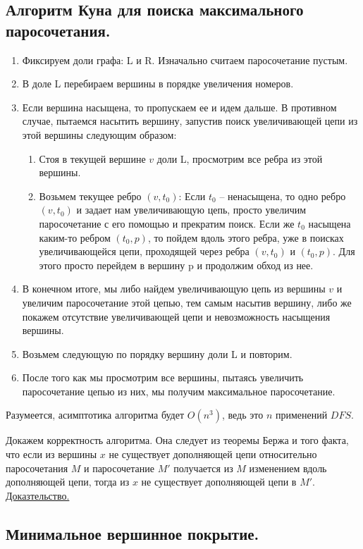 \subsection{Алгоритм Куна для поиска максимального паросочетания.}
\begin{enumerate}
	\item Фиксируем доли графа: L и R. Изначально считаем паросочетание пустым. 
	\item В доле L перебираем вершины в порядке увеличения номеров.
	\item Если вершина насыщена, то пропускаем ее и идем дальше.
В противном случае, пытаемся насытить вершину, запустив поиск увеличивающей цепи из этой вершины следующим образом: 
	\begin{enumerate}
		\item Стоя в текущей вершине $v$ доли L, просмотрим все ребра из этой вершины.
		\item Возьмем текущее ребро $(v, t_0)$: 
Если $t_0$ -- ненасыщена, то одно ребро $(v, t_0)$ и задает нам увеличивающую цепь, просто увеличим паросочетание с его помощью и прекратим поиск.
Если же $t_0$ насыщена каким-то ребром  $(t_0, p)$, то пойдем вдоль этого ребра, уже в поисках увеличивающейся цепи, проходящей через ребра $(v, t_0)$ и  $(t_0, p)$. Для этого просто перейдем в вершину p и продолжим обход из нее.
	\end{enumerate}
\item В конечном итоге, мы либо найдем увеличивающую цепь из вершины $v$ и увеличим паросочетание этой цепью, тем самым насытив вершину, либо же покажем отсутствие увеличивающей цепи и невозможность насыщения вершины.
\item Возьмем следующую по порядку вершину доли L и повторим.
\item После того как мы просмотрим все вершины, пытаясь увеличить паросочетание цепью из них, мы получим максимальное паросочетание.
\end{enumerate}
Разумеется, асимптотика алгоритма будет $O(n^3)$, ведь это $n$ применений $DFS$. 
\par
Докажем корректность алгоритма. Она следует из теоремы Бержа и того факта, что если из вершины $x$ не существует дополняющей цепи относительно паросочетания $M$ и паросочетание $M'$ получается из $M$ изменением вдоль дополняющей цепи, тогда из $x$ не существует дополняющей цепи в $M'$. \href{http://gg.gg/njb4g}{Доказтельство.}

\subsection*{Минимальное вершинное покрытие.}%
\label{sub:Минимальное вершинное покрытие.}

